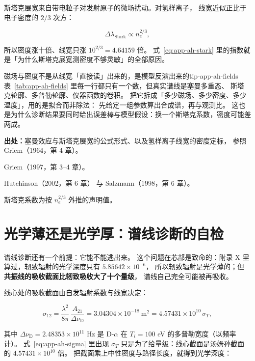 斯塔克展宽来自带电粒子对发射原子的微场扰动。对氢样离子，
线宽近似正比于电子密度的 $2/3$ 次方：

\begin{equation}
\Delta\lambda_{\mathrm{Stark}} \propto n_e^{2/3},
\label{eq:app-ah-stark}
\end{equation}

所以密度涨十倍、线宽只涨 $10^{2/3}=4.64159$ 倍。
式~\eqref{eq:app-ah-stark} 里的指数就是「为什么斯塔克展宽测密度不够灵敏」的全部原因。

\begin{tip}{磁场与密度不是从线宽「直接读」出来的，是模型反演出来的}{tip-app-ah-fields}
表~\ref{tab:app-ah-fields} 里每一行都只有一个数，但真实谱线是塞曼多重态、
斯塔克轮廓、多普勒轮廓、仪器函数的卷积。
把它拆成「多少磁场、多少密度、多少温度」，用的是拟合而非除法：
先给定一组参数算出合成谱，再与观测比。
这也是为什么诊断结果要同时给出误差棒与模型假设：换一个斯塔克系数，密度可能差两成。
\end{tip}

{\footnotesize
\textbf{出处：}塞曼效应与斯塔克展宽的公式形式、以及氢样离子线宽的密度定标，
参照 Griem（1964，第 4 章）。

Griem（1997，第 3--4 章）。

Hutchinson（2002，第 6 章）
与 Salzmann（1998，第 6 章）。

斯塔克系数为按 $n_e^{2/3}$ 外推的声明值。
}

\section{光学薄还是光学厚：谱线诊断的自检}
\label{sec:app-ah-opacity}

谱线诊断还有一个前提：它能不能逃出来。
这个问题在芯部是致命的：附录 X 里算过，轫致辐射的光学深度只有 $5.85642\times10^{-6}$，
所以轫致辐射是光学薄的；但\textbf{共振线的吸收截面比轫致吸收大了十个量级}，
谱线自己完全可能被再吸收。

线心处的吸收截面由自发辐射系数与线宽决定：

\begin{equation}
\sigma_{12} = \frac{\lambda^2}{8\pi}\,\frac{A_{21}}{\Delta\nu_{\mathrm{D}}}
  = 3.04304\times10^{-18}\ \mathrm{m^2} = 4.57431\times10^{10}\,\sigma_T,
\label{eq:app-ah-sigma}
\end{equation}

其中 $\Delta\nu_{\mathrm{D}}=2.48353\times10^{11}$ Hz 是 D-$\alpha$ 在 $T_i=100$ eV 的多普勒宽度（以频率计）。
式~\eqref{eq:app-ah-sigma} 里出现 $\sigma_T$ 只是为了给量级：线心截面是汤姆孙截面的 $4.57431\times10^{10}$ 倍。
把截面乘上中性密度与路径长度，就得到光学深度：

